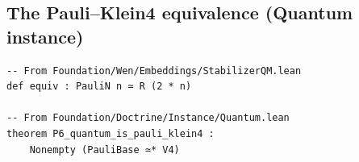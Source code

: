\documentclass[11pt,a4paper]{article}
\theoremstyle{plain}
\theoremstyle{definition}
\theoremstyle{remark}
\begin{document}
\subsection{The Pauli--Klein4 equivalence (Quantum instance)}\label{app:lean:pauli}

\begin{lstlisting}[language=Lean]
-- From Foundation/Wen/Embeddings/StabilizerQM.lean
def equiv : PauliN n ≃ R (2 * n)

-- From Foundation/Doctrine/Instance/Quantum.lean
theorem P6_quantum_is_pauli_klein4 :
    Nonempty (PauliBase ≃* V4)
\end{lstlisting}

\end{document}
